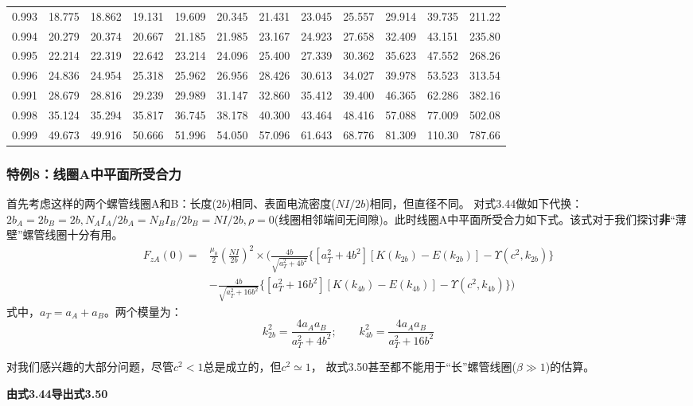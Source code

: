 \begin{table}[htbp]
\begin{tabular}{|c|c|c|c|c|c|c|c|c|c|c|c|}
		0.993 & 18.775 & 18.862 & 19.131 & 19.609 & 20.345 & 21.431 & 23.045 & 25.557 & 29.914 & 39.735 & 211.22 \\
		0.994 & 20.279 & 20.374 & 20.667 & 21.185 & 21.985 & 23.167 & 24.923 & 27.658 & 32.409 & 43.151 & 235.80 \\
		0.995 & 22.214 & 22.319 & 22.642 & 23.214 & 24.096 & 25.400 & 27.339 & 30.362 & 35.623 & 47.552 & 268.26 \\
		0.996 & 24.836 & 24.954 & 25.318 & 25.962 & 26.956 & 28.426 & 30.613 & 34.027 & 39.978 & 53.523 & 313.54 \\
		0.991 & 28.679 & 28.816 & 29.239 & 29.989 & 31.147 & 32.860 & 35.412 & 39.400 & 46.365 & 62.286 & 382.16 \\
		0.998 & 35.124 & 35.294 & 35.817 & 36.745 & 38.178 & 40.300 & 43.464 & 48.416 & 57.088 & 77.009 & 502.08 \\ 
		0.999 & 49.673 & 49.916 & 50.666 & 51.996 & 54.050 & 57.096 & 61.643 & 68.776 & 81.309 & 110.30 & 787.66 \\ \hline
	\end{tabular}
\end{table}

\subsubsection{特例8：线圈A中平面所受合力}
首先考虑这样的两个螺管线圈A和B：长度($2b$)相同、表面电流密度($NI/2b$)相同，但直径不同。
对式3.44做如下代换：$2b_A = 2b_B = 2b, N_A I_A/2b_A = N_B I_B/2b_B = N I/2b,\rho=0$(线圈相邻端间无间隙)。此时线圈A中平面所受合力如下式。该式对于我们探讨\textbf{非}``薄壁''螺管线圈十分有用。
\begin{equation}
\begin{split}
F_{zA}(0)=&\frac{\mu_0}{2}\left(\frac{NI}{2b}\right)^2\times\bigg(\frac{4b}{\sqrt{a_T^2+4b^2}} \big\{[a_T^2+4b^2][K(k_{2b})-E(k_{2b})]-\Upsilon(c^2,k_{2b})\big\}\\
&-\frac{4b}{\sqrt{a_T^2+16b^2}} \big\{[a_T^2+16b^2][K(k_{4b})-E(k_{4b})]-\Upsilon(c^2,k_{4b}) \big\}\bigg)
\end{split}
\end{equation}
式中，$a_T=a_A+a_B$。两个模量为：
$$k_{2b}^2=\frac{4a_A a_B}{a_T^2+4b^2} ; \qquad k_{4b}^2=\frac{4a_A a_B}{a_T^2+16b^2} $$

对我们感兴趣的大部分问题，尽管$c^2<1$总是成立的，但$c^2\simeq 1$，
故式3.50甚至都不能用于``长''螺管线圈($\beta\gg 1$)的估算。

\textbf{由式3.44导出式3.50}

